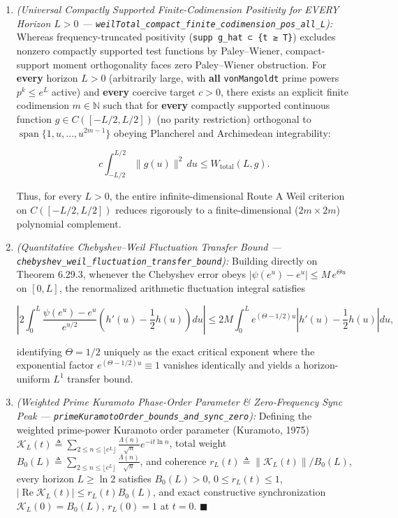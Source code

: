\documentclass[
  11pt,
]{article}
\begin{document}
\begin{enumerate}
  \[\frac{1}{20} \int_{-L/2}^{L/2} \|g(u)\|^2\,du \le W_{\text{total}}(L, g).\]
\item
  \emph{(Universal Compactly Supported Finite-Codimension Positivity for
  EVERY Horizon \(L > 0\) ---
  \texttt{weilTotal\_compact\_finite\_codimension\_pos\_all\_L}):}
  Whereas frequency-truncated positivity
  (\texttt{supp\ g\_hat\ ⊂\ \{\textbar{}t\textbar{}\ ≥\ T\}}) excludes
  nonzero compactly supported test functions by Paley--Wiener,
  compact-support moment orthogonality faces zero Paley--Wiener
  obstruction. For \textbf{every} horizon \(L > 0\) (arbitrarily large,
  with \textbf{all} \texttt{vonMangoldt} prime powers \(p^k \le e^L\)
  active) and \textbf{every} coercive target \(c > 0\), there exists an
  explicit finite codimension \(m \in \mathbb{N}\) such that for
  \textbf{every} compactly supported continuous function
  \(g \in C([-L/2, L/2])\) (no parity restriction) orthogonal to
  \(\operatorname{span}\{1, u, \dots, u^{2m-1}\}\) obeying Plancherel
  and Archimedean integrability:

  \[c \int_{-L/2}^{L/2} \|g(u)\|^2\,du \le W_{\text{total}}(L, g).\]

  Thus, for every \(L > 0\), the entire infinite-dimensional Route A
  Weil criterion on \(C([-L/2, L/2])\) reduces rigorously to a
  finite-dimensional (\(2m \times 2m\)) polynomial complement.
\item
  \emph{(Quantitative Chebyshev--Weil Fluctuation Transfer Bound ---
  \texttt{chebyshev\_weil\_fluctuation\_transfer\_bound}):} Building
  directly on Theorem 6.29.3, whenever the Chebyshev error obeys
  \(|\psi(e^u) - e^u| \le M\,e^{\Theta u}\) on \([0, L]\), the
  renormalized arithmetic fluctuation integral satisfies

  \[\left|2\int_0^L \frac{\psi(e^u) - e^u}{e^{u/2}}\left(h'(u) - \frac{1}{2}h(u)\right) du\right| \le 2M \int_0^L e^{(\Theta - 1/2)u}\left|h'(u) - \frac{1}{2}h(u)\right| du,\]

  identifying \(\Theta = 1/2\) uniquely as the exact critical exponent
  where the exponential factor \(e^{(\Theta - 1/2)u} \equiv 1\) vanishes
  identically and yields a horizon-uniform \(L^1\) transfer bound.
\item
  \emph{(Weighted Prime Kuramoto Phase-Order Parameter \& Zero-Frequency
  Sync Peak --- \texttt{primeKuramotoOrder\_bounds\_and\_sync\_zero}):}
  Defining the weighted prime-power Kuramoto order parameter (Kuramoto,
  1975)
  \(\mathcal{K}_L(t) \triangleq \sum_{2 \le n \le \lfloor e^L \rfloor} \frac{\Lambda(n)}{\sqrt{n}} e^{-it\ln n}\),
  total weight
  \(B_0(L) \triangleq \sum_{2 \le n \le \lfloor e^L \rfloor} \frac{\Lambda(n)}{\sqrt{n}}\),
  and coherence \(r_L(t) \triangleq \|\mathcal{K}_L(t)\|/B_0(L)\), every
  horizon \(L \ge \ln 2\) satisfies \(B_0(L) > 0\),
  \(0 \le r_L(t) \le 1\),
  \(|\operatorname{Re}\mathcal{K}_L(t)| \le r_L(t) B_0(L)\), and exact
  constructive synchronization \(\mathcal{K}_L(0) = B_0(L)\),
  \(r_L(0) = 1\) at \(t = 0\). \(\blacksquare\)
\end{enumerate}
\end{document}
